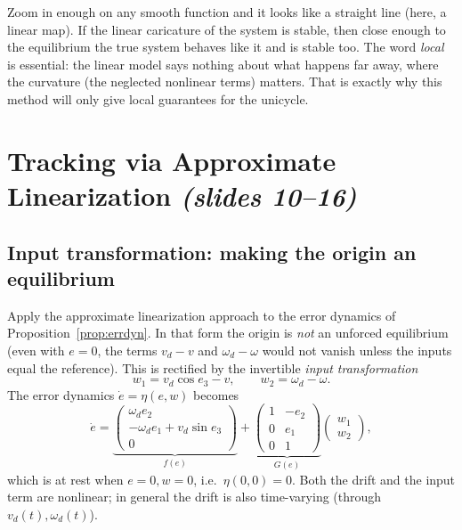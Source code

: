 \documentclass[11pt,a4paper]{article}
\def\bm#1{#1}%
\def\vect#1{#1}%
\newcommand{\vect}[1]{\bm{#1}}
\newcommand{\vd}{v_d}
\newcommand{\omd}{\omega_d}
\theoremstyle{definition}
\theoremstyle{plain}
\theoremstyle{remark}
\begin{document}
\begin{intuition}
Zoom in enough on any smooth function and it looks like a straight line (here, a linear map). If the linear caricature of the system is stable, then close enough to the equilibrium the true system behaves like it and is stable too. The word \emph{local} is essential: the linear model says nothing about what happens far away, where the curvature (the neglected nonlinear terms) matters. That is exactly why this method will only give local guarantees for the unicycle.
\end{intuition}

\section{Tracking via Approximate Linearization \texorpdfstring{\emph{(slides 10--16)}}{(slides 10--16)}}

\subsection{Input transformation: making the origin an equilibrium}

Apply the approximate linearization approach to the error dynamics of Proposition~\ref{prop:errdyn}. In that form the origin is \emph{not} an unforced equilibrium (even with $\vect e=\vect 0$, the terms $\vd-v$ and $\omd-\omega$ would not vanish unless the inputs equal the reference). This is rectified by the invertible \emph{input transformation}
\begin{equation}\label{eq:inputtransf}
w_1=\vd\cos e_3-v,\qquad w_2=\omd-\omega .
\end{equation}
The error dynamics $\dot{\vect e}=\vect\eta(\vect e,\vect w)$ becomes
\begin{equation}\label{eq:errfG}
\dot{\vect e}=\underbrace{\begin{pmatrix}\omd e_2\\-\omd e_1+\vd\sin e_3\\0\end{pmatrix}}_{\vect f(\vect e)}
+\underbrace{\begin{pmatrix}1&-e_2\\0&e_1\\0&1\end{pmatrix}}_{\vect G(\vect e)}\begin{pmatrix}w_1\\w_2\end{pmatrix},
\end{equation}
which is at rest when $\vect e=\vect 0,\vect w=\vect 0$, i.e.\ $\vect\eta(\vect 0,\vect 0)=\vect 0$. Both the drift and the input term are nonlinear; in general the drift is also time-varying (through $\vd(t),\omd(t)$).
\end{document}
